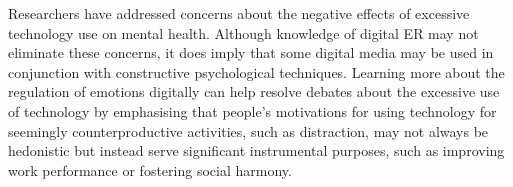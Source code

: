 \documentclass[lettersize,journal]{IEEEtran}
\begin{document}
Researchers have addressed concerns about the negative effects of excessive technology use on mental health. Although knowledge of digital ER may not eliminate these concerns, it does imply that some digital media may be used in conjunction with constructive psychological techniques. Learning more about the regulation of emotions digitally can help resolve debates about the excessive use of technology by emphasising that people's motivations for using technology for seemingly counterproductive activities, such as distraction, may not always be hedonistic but instead serve significant instrumental purposes, such as improving work performance or fostering social harmony.











 
\end{document}
